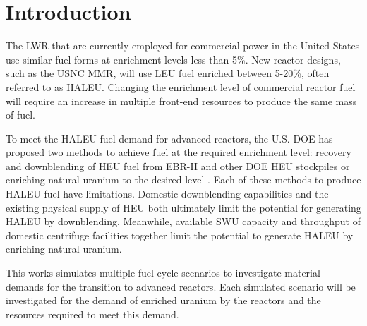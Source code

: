 \section{Introduction}
The \gls{LWR} that are currently employed for commercial power in the 
United States use similar fuel forms at enrichment levels 
less than 5\%. New reactor designs, such as the \gls{USNC} \gls{MMR}, will 
use \gls{LEU} fuel enriched between 5-20\%, often referred to as \gls{HALEU}.
Changing the enrichment level of commercial reactor fuel will require 
an increase in multiple front-end resources to produce the same mass of fuel. 

To meet the \gls{HALEU} fuel demand for advanced reactors, the U.S. 
\gls{DOE} has proposed two methods to achieve fuel at the 
required enrichment level: recovery and downblending of \gls{HEU} fuel 
from EBR-II and other \gls{DOE} \gls{HEU} stockpiles or enriching natural 
uranium to the desired level \cite{griffith_overview_2020}. Each of these 
methods to produce \gls{HALEU} fuel have limitations. Domestic downblending 
capabilities and the existing physical supply of \gls{HEU} both ultimately 
limit the potential for generating \gls{HALEU} by downblending. Meanwhile, 
available \gls{SWU} capacity and throughput of domestic centrifuge 
facilities together limit the potential to generate \gls{HALEU} by 
enriching natural uranium. 

This works simulates multiple fuel cycle scenarios to investigate 
material demands for the transition to advanced reactors. Each simulated 
scenario will be investigated for the demand of enriched uranium by the 
reactors and the resources required to meet this demand. 